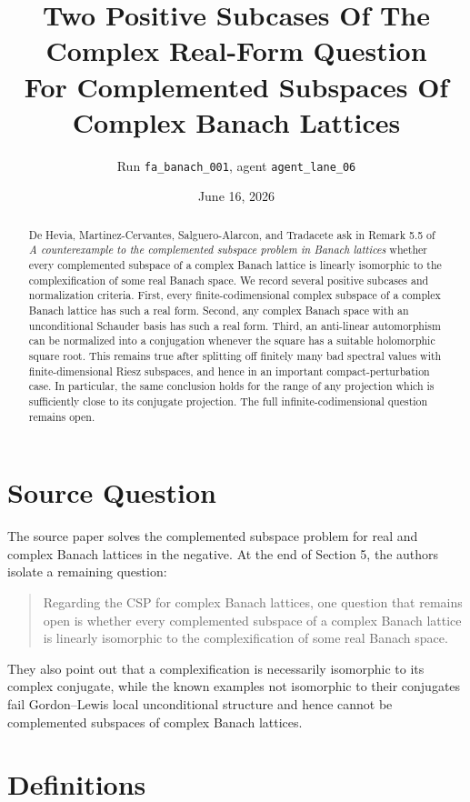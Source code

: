 \documentclass[11pt]{article}
\title{Two Positive Subcases Of The Complex Real-Form Question\\
For Complemented Subspaces Of Complex Banach Lattices}
\author{Run \texttt{fa\_banach\_001}, agent \texttt{agent\_lane\_06}}
\date{June 16, 2026}
\theoremstyle{remark}
\begin{document}
\maketitle

\begin{abstract}
De Hevia, Martinez-Cervantes, Salguero-Alarcon, and Tradacete ask in
Remark 5.5 of \emph{A counterexample to the complemented subspace problem in
Banach lattices} whether every complemented subspace of a complex Banach
lattice is linearly isomorphic to the complexification of some real Banach
space.  We record several positive subcases and normalization criteria.  First,
every finite-codimensional complex subspace of a complex Banach lattice has
such a real form.  Second, any complex Banach space with an unconditional
Schauder basis has such a real form.  Third, an anti-linear automorphism can be
normalized into a conjugation whenever the square has a suitable holomorphic
square root.  This remains true after splitting off finitely many bad spectral
values with finite-dimensional Riesz subspaces, and hence in an important
compact-perturbation case.  In particular, the same
conclusion holds for the range of any projection which is sufficiently close
to its conjugate projection.  The full infinite-codimensional question remains
open.
\end{abstract}

\section{Source Question}

The source paper solves the complemented subspace problem for real and complex
Banach lattices in the negative.  At the end of Section 5, the authors isolate
a remaining question:

\begin{quote}
Regarding the CSP for complex Banach lattices, one question that remains open
is whether every complemented subspace of a complex Banach lattice is linearly
isomorphic to the complexification of some real Banach space.
\end{quote}

They also point out that a complexification is necessarily isomorphic to its
complex conjugate, while the known examples not isomorphic to their conjugates
fail Gordon--Lewis local unconditional structure and hence cannot be
complemented subspaces of complex Banach lattices.

\section{Definitions}
\end{document}
